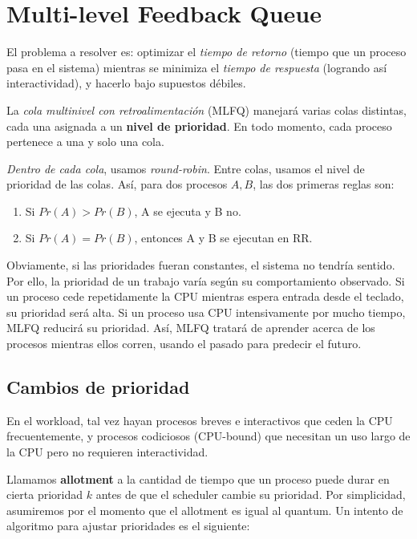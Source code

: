 \documentclass[12pt]{article}
\theoremstyle{definition}
\begin{document}
\pagebreak 

\section{Multi-level Feedback Queue}

El problema a resolver es: optimizar el \textit{tiempo de retorno} (tiempo que un proceso pasa en el sistema) mientras se minimiza el \textit{tiempo de respuesta} (logrando así interactividad), y hacerlo bajo supuestos débiles.

La \textit{cola multinivel con retroalimentación} (MLFQ) manejará varias colas distintas, cada una asignada a un \textbf{nivel de prioridad}. En todo momento, cada proceso pertenece a una y solo una cola.

\textit{Dentro de cada cola}, usamos \textit{round-robin}. Entre colas, usamos el nivel de prioridad de las colas. Así, para dos procesos $A, B$, las dos primeras reglas son:

\begin{enumerate}
\item Si $Pr(A) > Pr(B)$, A se ejecuta y B no.
\item Si $Pr(A) = Pr(B)$, entonces A y B se ejecutan en RR.
\end{enumerate}

Obviamente, si las prioridades fueran constantes, el sistema no tendría sentido.
Por ello, la prioridad de un trabajo varía según su comportamiento observado. Si
un proceso cede repetidamente la CPU mientras espera entrada desde el teclado,
su prioridad será alta. Si un proceso usa CPU intensivamente por mucho tiempo,
MLFQ reducirá su prioridad. Así, MLFQ tratará de aprender acerca de los procesos
mientras ellos corren, usando el pasado para predecir el futuro.


\subsection{Cambios de prioridad}

En el workload, tal vez hayan procesos breves e interactivos que ceden la CPU
frecuentemente, y procesos codiciosos (CPU-bound) que necesitan un uso largo de
la CPU pero no requieren interactividad.

Llamamos \textbf{allotment} a la cantidad de tiempo que un proceso puede durar
en cierta prioridad $k$ antes de que el scheduler cambie su prioridad. Por
simplicidad, asumiremos por el momento que el allotment es igual al quantum.
Un intento de algoritmo para ajustar prioridades es el siguiente: 
\end{document}
